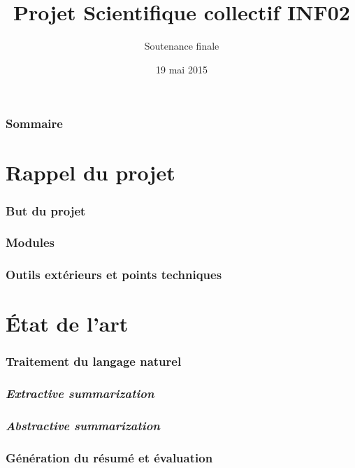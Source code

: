 \documentclass[12pt]{beamer}
\title{Projet Scientifique collectif INF02}
\subtitle{Soutenance finale}
\author{}
\date{19 mai 2015}
\begin{document}
    \begin{frame}
      \titlepage
    \end{frame}		

    \begin{frame}
      \frametitle{Sommaire}
      \tableofcontents
    \end{frame}

\section{Rappel du projet}


\begin{frame}
 \frametitle{But du projet}
 

\end{frame}


\begin{frame}
 \frametitle{Modules}
 
 
\end{frame}


\begin{frame}
 \frametitle{Outils extérieurs et points techniques}
 
 
\end{frame}

\section{État de l'art}

\begin{frame}
 \frametitle{Traitement du langage naturel}
 
 
\end{frame}

\begin{frame}
 \frametitle{\textit{Extractive summarization}}
 
 
\end{frame}

\begin{frame}
 \frametitle{\textit{Abstractive summarization}}
 
 
\end{frame}


\begin{frame}
 \frametitle{Génération du résumé et évaluation}
 
 
\end{frame}
\end{document}
